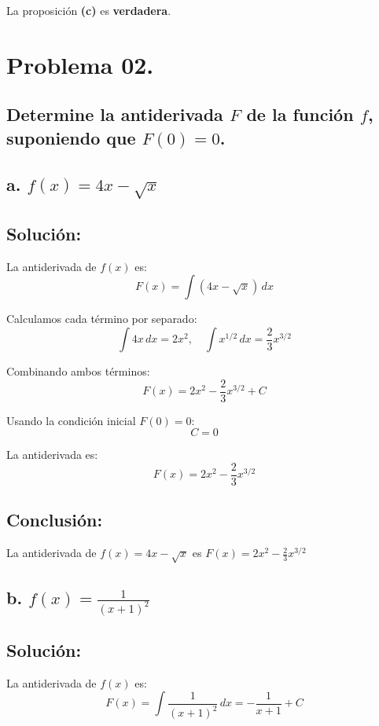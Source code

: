 \documentclass{article}
\begin{document}
La proposición \textbf{(c)} es \textbf{verdadera}.

\section*{Problema 02.}

\subsection*{Determine la antiderivada \( F \) de la función \( f \), suponiendo que \( F(0) = 0 \).}

\subsection*{\newline a. \(f(x) = 4x - \sqrt{x}\)}
\subsection*{Solución: }

La antiderivada de \( f(x) \) es:
\[
F(x) = \int (4x - \sqrt{x}) \, dx
\]

\noindent Calculamos cada término por separado:
\[
\int 4x \, dx = 2x^2, \quad \int x^{1/2} \, dx = \frac{2}{3}x^{3/2}
\]

\noindent Combinando ambos términos:
\[
F(x) = 2x^2 - \frac{2}{3}x^{3/2} + C
\]

\noindent Usando la condición inicial \( F(0) = 0 \):
\[
C = 0
\]

\noindent La antiderivada es:
\[
F(x) = 2x^2 - \frac{2}{3}x^{3/2}
\]

\subsection*{Conclusión:}

La antiderivada de \( f(x) = 4x - \sqrt{x} \) es \( F(x) = 2x^2 - \frac{2}{3}x^{3/2} \)

\subsection*{\newline b. \(f(x) = \frac{1}{(x+1)^2}\)}
\subsection*{Solución: }

La antiderivada de \( f(x) \) es:
\[
F(x) = \int \frac{1}{(x+1)^2} \, dx = -\frac{1}{x+1} + C
\]
\end{document}
